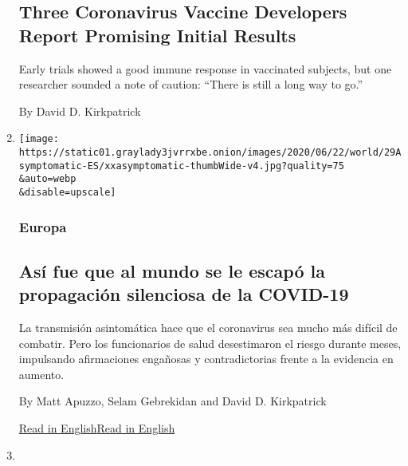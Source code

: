 \begin{enumerate}
  \hypertarget{three-coronavirus-vaccine-developers-report-promising-initial-results}{%
  \subsection{Three Coronavirus Vaccine Developers Report Promising
  Initial
  Results}\label{three-coronavirus-vaccine-developers-report-promising-initial-results}}

  Early trials showed a good immune response in vaccinated subjects, but
  one researcher sounded a note of caution: ``There is still a long way
  to go.''

  By David D. Kirkpatrick
\item
  \href{/es/2020/06/29/espanol/mundo/coronavirus-asintomaticos.html}{}

  \texttt{[image: https://static01.graylady3jvrrxbe.onion/images/2020/06/22/world/29Asymptomatic-ES/xxasymptomatic-thumbWide-v4.jpg?quality=75\\\&auto=webp\\\&disable=upscale]}

  \hypertarget{europa}{%
  \subsubsection{Europa}\label{europa}}

  \hypertarget{asuxed-fue-que-al-mundo-se-le-escapuxf3-la-propagaciuxf3n-silenciosa-de-la-covid-19}{%
  \subsection{Así fue que al mundo se le escapó la propagación
  silenciosa de la
  COVID-19}\label{asuxed-fue-que-al-mundo-se-le-escapuxf3-la-propagaciuxf3n-silenciosa-de-la-covid-19}}

  La transmisión asintomática hace que el coronavirus sea mucho más
  difícil de combatir. Pero los funcionarios de salud desestimaron el
  riesgo durante meses, impulsando afirmaciones engañosas y
  contradictorias frente a la evidencia en aumento.

  By Matt Apuzzo, Selam Gebrekidan and David D. Kirkpatrick

  \href{https://www.nytimes3xbfgragh.onion/2020/06/27/world/europe/coronavirus-spread-asymptomatic.html}{Read
  in
  English}\href{https://www.nytimes3xbfgragh.onion/2020/06/27/world/europe/coronavirus-spread-asymptomatic.html}{Read
  in English}
\item
  \href{/2020/06/07/world/europe/imperial-college-uk-vaccine-coronavirus.html}{}


\end{enumerate}
